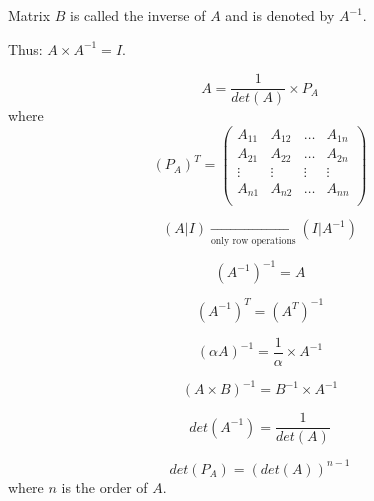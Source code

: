     \par Matrix $B$ is called the inverse of $A$ and is denoted by $A^{-1}$.
    \par Thus: $A \times A^{-1} = I$.

      \[
        A = \frac{1}{det(A)} \times P_{A}
      \]
      where
      \[
        (P_{A})^{T} =
        \begin{pmatrix}
          A_{11} & A_{12} & \ldots & A_{1n} \\
          A_{21} & A_{22} & \ldots & A_{2n} \\
          \vdots & \vdots & \vdots & \vdots \\
          A_{n1} & A_{n2} & \ldots & A_{nn} \\
        \end{pmatrix}
      \]

    \[ 
      (A|I) \xrightarrow[\text{only row operations}]{} (I|A^{-1})
    \] 
  \hiiEND

      \[
        (A^{-1})^{-1} = A
      \]

      \[
        (A^{-1})^{T} = (A^{T})^{-1}
      \]

      \[
        (\alpha A)^{-1} = \frac{1}{\alpha} \times A^{-1}
      \]
    
      \[
        (A \times B)^{-1} = B^{-1} \times A^{-1}
      \]

      \[
        det(A^{-1}) = \frac{1}{det(A)}
      \]

      \[
        det(P_{A}) = (det(A))^{n - 1}
      \]
      where $n$ is the order of $A$.



  \hiiEND
